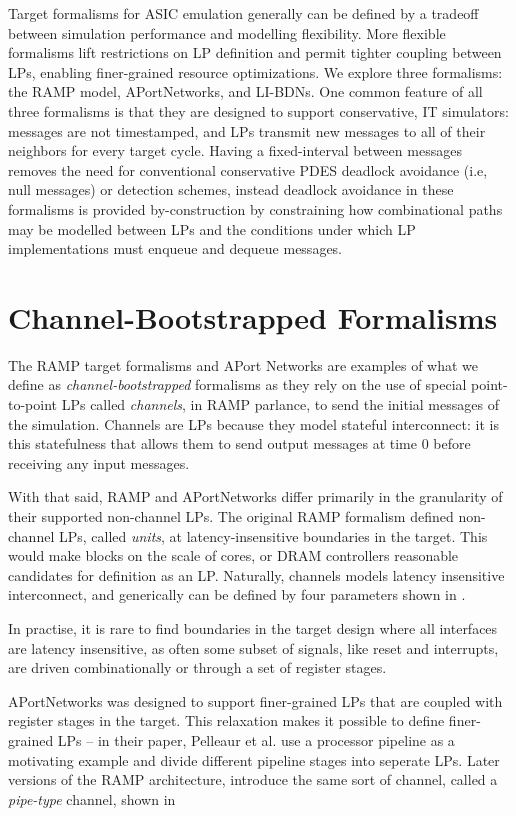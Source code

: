 Target formalisms for ASIC emulation generally can be defined by a tradeoff
between simulation performance and modelling flexibility. More flexible
formalisms lift restrictions on LP definition and permit tighter coupling
between LPs, enabling finer-grained resource optimizations. We explore three
formalisms: the RAMP model, APortNetworks, and LI-BDNs. One common feature of
all three formalisms is that they are designed to support conservative, IT
simulators: messages are not timestamped, and LPs transmit new messages to all
of their neighbors for every target cycle. Having a fixed-interval between
messages removes the need for conventional conservative PDES deadlock avoidance
(i.e, null messages) or detection schemes, instead deadlock avoidance in these
formalisms is provided by-construction by constraining how combinational paths
may be modelled between LPs and the conditions under which LP implementations
must enqueue and dequeue messages.

\section{Channel-Bootstrapped Formalisms}

The RAMP target formalisms and APort Networks are examples of what we define as
\emph{channel-bootstrapped} formalisms as they rely on the use of special
point-to-point LPs called \emph{channels}, in RAMP parlance, to send the
initial messages of the simulation. Channels are LPs because they
model stateful interconnect: it is this statefulness that allows them to send output
messages at time 0 before receiving any input messages.

With that said, RAMP and APortNetworks differ primarily in the granularity of
their supported non-channel LPs. The original RAMP formalism defined
non-channel LPs, called \emph{units}, at latency-insensitive boundaries in the
target. This would make blocks on the scale of cores, or DRAM controllers
reasonable candidates for definition as an LP. Naturally, channels models latency
insensitive interconnect, and generically can be defined by four parameters shown in .

In practise, it is rare to find boundaries in the target design where all
interfaces are latency insensitive, as often some subset of signals, like reset
and interrupts, are driven combinationally or through a set of register stages.

APortNetworks was designed to support finer-grained LPs that are coupled with
register stages in the target. This relaxation makes it possible to define
finer-grained LPs -- in their paper, Pelleaur et al. use a processor pipeline
as a motivating example and divide different pipeline stages into seperate LPs.
Later versions of the RAMP architecture, introduce the same sort of channel,
called a \emph{pipe-type} channel, shown in 

